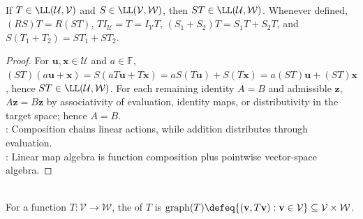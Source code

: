 \begin{proposition} \label{prop:linear-map-product-algebra} \\
If $T\in\LL(\mathcal{U},\mathcal{V})$ and $S\in\LL(\mathcal{V},\mathcal{W})$, then $ST\in\LL(\mathcal{U},\mathcal{W})$. Whenever defined, $(RS)T=R(ST)$, $TI_{\mathcal{U}}=T=I_{\mathcal{V}}T$, $(S_1+S_2)T=S_1T+S_2T$, and $S(T_1+T_2)=ST_1+ST_2$.
\begin{proof}
For $\mathbf{u},\mathbf{x}\in\mathcal{U}$ and $a\in\mathbb{F}$, $(ST)(a\mathbf{u}+\mathbf{x})=S(aT\mathbf{u}+T\mathbf{x})=aS(T\mathbf{u})+S(T\mathbf{x})=a(ST)\mathbf{u}+(ST)\mathbf{x}$, hence $ST\in\LL(\mathcal{U},\mathcal{W})$. For each remaining identity $A=B$ and admissible $\mathbf{z}$, $A\mathbf{z}=B\mathbf{z}$ by associativity of evaluation, identity maps, or distributivity in the target space; hence $A=B$.\\
: Composition chains linear actions, while addition distributes through evaluation.\\
: Linear map algebra is function composition plus pointwise vector-space algebra.
\end{proof}
\end{proposition}

\begin{definition} \\
For a function $T:\mathcal{V}\to\mathcal{W}$, the  of $T$ is $\operatorname{graph}(T)\defeq\{(\mathbf{v},T\mathbf{v}):\mathbf{v}\in\mathcal{V}\}\subseteq\mathcal{V}\times\mathcal{W}$.
\end{definition}

